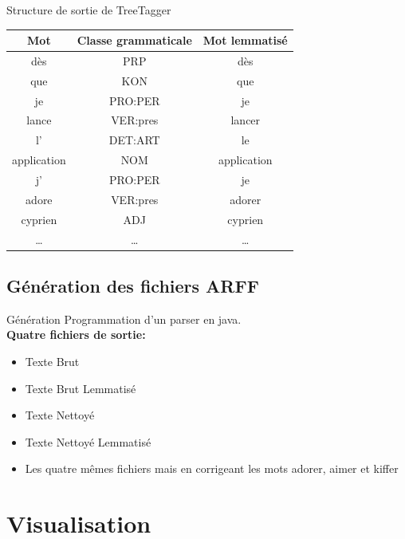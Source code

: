\documentclass{beamer}
\begin{document}
\begin{frame}
\begin{exampleblock}{Structure de sortie de TreeTagger}
			\centering
			 \begin{tabular}{|c|c|c|}
					\hline
					Mot&Classe grammaticale&Mot lemmatisé\\
					\hline
					dès&PRP&dès\\
					que&KON&que\\
					je&PRO:PER&je\\
					lance&VER:pres&lancer\\
					l'&DET:ART&le\\
					application&NOM&application\\
					j'&PRO:PER&je\\
					adore&VER:pres&adorer\\
					cyprien&ADJ&cyprien\\
					\dots&\dots&\dots\\
					\hline
			 \end{tabular}
	\end{exampleblock}

\end{frame}

\subsection{Génération des fichiers ARFF}
\begin{frame}
	\begin{block}{Génération}
		Programmation d'un parser en java.\\
		
		\textbf{Quatre fichiers de sortie:}
		\begin{itemize}
			\item Texte Brut
			\item Texte Brut Lemmatisé
			\item Texte Nettoyé
			\item Texte Nettoyé Lemmatisé
			\item Les quatre mêmes fichiers mais en corrigeant les mots adorer, aimer et kiffer
		\end{itemize}
	\end{block}
\end{frame}

\section{Visualisation}
\end{document}
